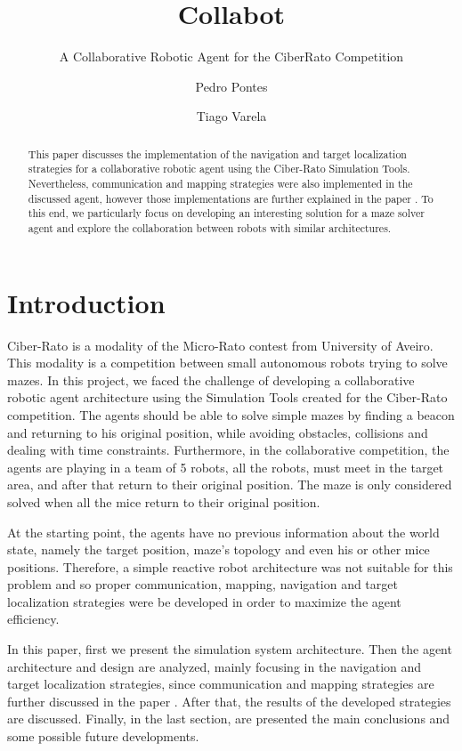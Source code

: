 \documentclass[oribibl]{llncs}
\title{Collabot}
\subtitle{A Collaborative Robotic Agent for the CiberRato Competition  }
\author{Pedro Pontes \and Tiago Varela}
\institute{Faculdade de Engenharia da Universidade do Porto}
\begin{document}
\maketitle
\begin{abstract}
This paper discusses the implementation of the navigation and target localization strategies for a  collaborative robotic agent using the Ciber-Rato Simulation Tools. Nevertheless, communication and mapping strategies were also implemented in the discussed agent, however those implementations are further explained in the paper \cite{baboehelder}.
To this end, we particularly focus on developing an interesting solution for a maze solver agent and explore the collaboration between robots with similar architectures.
\end{abstract}

\section{Introduction}
Ciber-Rato is a modality of the Micro-Rato contest from University of Aveiro. This modality is a competition between small autonomous robots trying to solve mazes. \cite{Lau2002} 
In this project, we faced the challenge of developing a collaborative robotic agent architecture using the Simulation Tools created for the Ciber-Rato competition. The agents should be able to solve simple mazes by finding a beacon and returning to his original position, while avoiding obstacles, collisions and dealing with time constraints. Furthermore, in the collaborative competition, the agents are playing in a team of 5 robots, all the robots, must meet in the target area, and after that return to their original position. The maze is only considered solved when all the mice return to their original position.

At the starting point, the agents have no previous information about the world state, namely the target position, maze's topology and even his or other mice positions. Therefore, a simple reactive robot architecture was not suitable for this problem and so proper communication, mapping, navigation and target localization strategies were be developed in order to maximize the agent efficiency.

In this paper, first we present the simulation system architecture. Then the agent architecture and design are analyzed, mainly focusing in the navigation and target localization strategies, since communication and mapping strategies are further discussed in the paper \cite{baboehelder}. After that, the results of the developed strategies are discussed. Finally, in the last section, are presented the main conclusions and some possible future developments.
\end{document}
